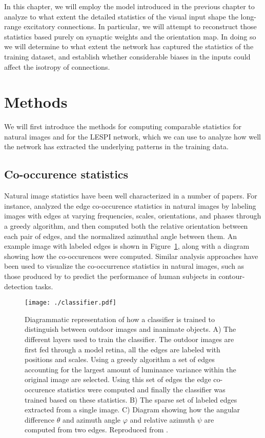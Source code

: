 In this chapter, we will employ the model introduced in the previous
chapter to analyze to what extent the detailed statistics of the
visual input shape the long-range excitatory connections.  In
particular, we will attempt to reconstruct those statistics based
purely on synaptic weights and the orientation map. In doing so we
will determine to what extent the network has captured the statistics
of the training dataset, and establish whether considerable biases in
the inputs could affect the isotropy of connections.

\section{Methods}

We will first introduce the methods for computing comparable
statistics for natural images and for the LESPI network, which we can
use to analyze how well the network has extracted the underlying
patterns in the training data.

\subsection{Co-occurence statistics}

Natural image statistics have been well characterized in a number of
papers. For instance, \cite{Perrinet2015} analyzed the edge
co-occurence statistics in natural images by labeling images with
edges at varying frequencies, scales, orientations, and phases through
a greedy algorithm, and then computed both the relative orientation
between each pair of edges, and the normalized azimuthal angle between
them. An example image with labeled edges is shown in
Figure~\ref{classifier}, along with a diagram showing how the
co-occurences were computed. Similar analysis approaches have been
used to visualize the co-occurrence statistics in natural images, such
as those produced by \cite{Geisler2001} to predict the performance of
human subjects in contour-detection tasks.

\begin{figure}
	\centering
    \texttt{[image: ./classifier.pdf]}
	\caption[] {Diagrammatic representation of how a classifier is
      trained to distinguish between outdoor images and inanimate
      objects. A) The different layers used to train the
      classifier. The outdoor images are first fed through a model
      retina, all the edges are labeled with positions and
      scales. Using a greedy algorithm a set of edges accounting for
      the largest amount of luminance variance within the original
      image are selected. Using this set of edges the edge
      co-occurence statistics were computed and finally the classifier
      was trained based on these statistics. B) The sparse set
      of labeled edges extracted from a single image. C) Diagram
      showing how the angular difference $\theta$ and azimuth angle
      $\varphi$ and relative azimuth $\psi$ are computed from two
      edges. Reproduced from \cite{Perrinet2015}.}
	\label{classifier}
\end{figure}

